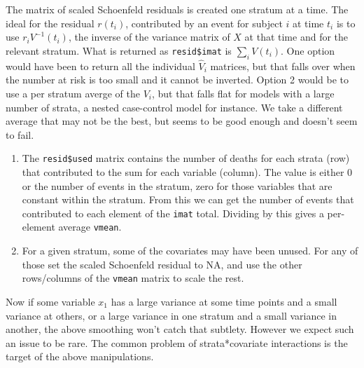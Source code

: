 \documentclass{article}
\newcommand{\code}[1]{\texttt{#1}}
\begin{document}
The matrix of scaled Schoenfeld residuals is created one stratum at a
time. 
The ideal for the residual $r(t_i)$, contributed by an event for subject
$i$ at time $t_i$ is to use $r_iV^{-1}(t_i)$, the inverse of the  variance 
matrix of $X$ at that time and for the relevant stratum.
What is returned as \code{resid\$imat} is $\sum_i V(t_i)$.
One option would have been to return all the individual $\hat V_i$ matrices,
but that falls over when the number at risk is too small and it cannot
be inverted.
Option 2 would be to use a per stratum averge of the $V_i$, but that falls
flat for models with a large number of strata, a nested case-control model
for instance. 
We take a different average that may not be the best, but seems to be
good enough and doesn't seem to fail.
\begin{enumerate}
  \item The \code{resid\$used} matrix contains the number of deaths for
    each strata (row) that contributed to the sum for each variable (column).
    The value is either 0 or the number of events in the stratum, zero for those
    variables that are constant within the stratum.  From this we can get the
    number of events that contributed to each element of the \code{imat} total.
    Dividing by this gives a per-element average \code{vmean}.  
  \item For a given stratum, some of the covariates may have been unused.  For
    any of those set the scaled Schoenfeld residual to NA, and use the other
    rows/columns of the \code{vmean} matrix to scale the rest.
\end{enumerate}
Now if some variable $x_1$ has a large variance at some time points and a
small variance at others, or a large variance in one stratum and a small
variance in another, the above smoothing won't catch that subtlety.
However we expect such an issue to be rare. 
The common problem of strata*covariate interactions is the target of the
above manipulations.
\end{document}
